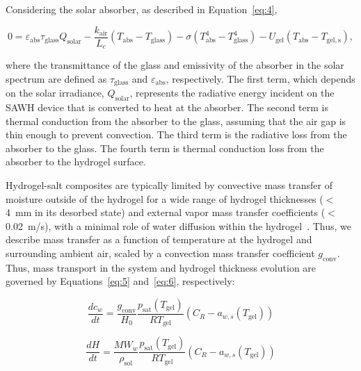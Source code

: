 \documentclass[11pt]{article}
\begin{document}
Considering the solar absorber, as described in Equation~\ref{eq:4},

\begin{equation}
0 = \varepsilon_{\mathrm{abs}} \tau_{\mathrm{glass}} Q_{\mathrm{solar}} - \frac{k_{\mathrm{air}}}{L_c}\left(T_{\mathrm{abs}} - T_{\mathrm{glass}}\right) - \sigma\left(T_{\mathrm{abs}}^4 - T_{\mathrm{glass}}^4\right) - U_{\mathrm{gel}}\left(T_{\mathrm{abs}} - T_{\mathrm{gel,s}}\right),
\label{eq:4}
\end{equation}

\noindent where the transmittance of the glass and emissivity of the absorber in the solar spectrum are defined as $\tau_{\mathrm{glass}}$ and $\varepsilon_{\mathrm{abs}}$, respectively. The first term, which depends on the solar irradiance, $Q_{\mathrm{solar}}$, represents the radiative energy incident on the SAWH device that is converted to heat at the absorber. The second term is thermal conduction from the absorber to the glass, assuming that the air gap is thin enough to prevent convection. The third term is the radiative loss from the absorber to the glass. The fourth term is thermal conduction loss from the absorber to the hydrogel surface.

Hydrogel-salt composites are typically limited by convective mass transfer of moisture outside of the hydrogel for a wide range of hydrogel thicknesses ($<$4~mm in its desorbed state) and external vapor mass transfer coefficients ($<$0.02~m/s), with a minimal role of water diffusion within the hydrogel~\cite{diazmarin2024b,diazmarin2024c}. Thus, we describe mass transfer as a function of temperature at the hydrogel and surrounding ambient air, scaled by a convection mass transfer coefficient $g_{\mathrm{conv}}$. Thus, mass transport in the system and hydrogel thickness evolution are governed by Equations~\ref{eq:5} and~\ref{eq:6}, respectively:

\begin{equation}
\frac{dc_w}{dt} = \frac{g_{\mathrm{conv}}}{H_0} \frac{p_{\mathrm{sat}}(T_{\mathrm{gel}})}{R T_{\mathrm{gel}}} \left(C_R - a_{w,s}(T_{\mathrm{gel}})\right)
\label{eq:5}
\end{equation}

\begin{equation}
\frac{dH}{dt} = \frac{MW_w}{\rho_{\mathrm{sol}}} \frac{p_{\mathrm{sat}}(T_{\mathrm{gel}})}{R T_{\mathrm{gel}}} \left(C_R - a_{w,s}(T_{\mathrm{gel}})\right)
\label{eq:6}
\end{equation}
\end{document}
